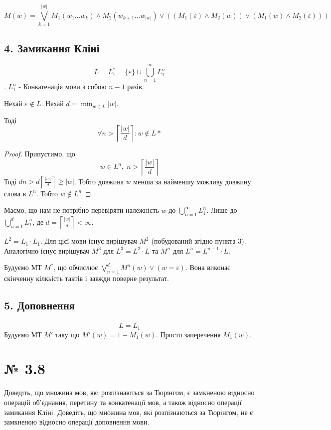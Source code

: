 \documentclass[11pt, a4paper]{article} %
\begin{document}
$$M(w) = \bigvee_{k=1}^{|w|} M_1(w_1 ... w_k) \wedge M_2(w_{k+1}...w_|w|) \vee \left(\left(M_1(\varepsilon) \wedge M_2(w)\right) \vee \left(M_1(w) \wedge M_2(\varepsilon)\right)\right)$$
\qedsymbol

\subsection*{4. Замикання Кліні}
$$L = L_1^* = \{\varepsilon\}\cup \bigcup_{n=1}^{\infty} L_1^n$$.
$L_1^n$ - Конкатенація мови з собою $n-1$ разів.

\begin{mdframed}[backgroundcolor=violet!10]
    Нехай $\varepsilon \notin L$. Нехай $d = \min_{w \in L} |w|$.
    
    Тоді $$\forall n > \left\lceil\frac{|w|}{d}\right\rceil: w \notin L*$$
    \begin{proof}
        Припустимо, що $$w \in L^n,\; n > \left\lceil\frac{|w|}{d}\right\rceil$$
        Тоді $dn > d\left\lceil\frac{|w|}{d}\right\rceil \ge |w|$.
        Тобто довжина $w$ менша за найменшу можливу довжину слова в $L^n$.
        Тобто $w \notin L^n$ 
    \end{proof}
\end{mdframed}
Маємо, що нам не потрібно перевіряти належність $w$ до $\bigcup_{n=1}^{\infty} L_1^n$. 
Лише до $\bigcup_{n=1}^{d} L_1^n$, де $d = \left\lceil\frac{|w|}{d}\right\rceil < \infty$.

$L^2 = L_1 \cdot L_1$. Для цієї мови існує вирішувач $M^2$ (побудований згідно пункта 3).
Аналогічно існує вирішувач $M^3$ для $L^3 = L^2 \cdot L$ та $M^n$ для $L^n = L^{n-1} \cdot L$.

Будуємо МТ $M^*$, що обчислює $\bigvee_{n=1}^{d} M^n(w) \vee (w=\varepsilon)$.
Вона виконає скінченну кілкьість тактів і завжди поверне результат.
\qedsymbol

\subsection*{5. Доповнення}
$$L = \overline{L_1}$$
Будуємо МТ $M'$ таку що $M'(w) = 1 - M_1(w)$. Просто заперечення $M_1(w)$. \qedsymbol

\section*{№ 3.8}
\begin{mdframed}
    Доведiть, що множина мов, якi розпiзнаються за Тюрiнгом, є замкненою
вiдносно операцiй об’єднання, перетину та конкатенацiї мов, а також вiдносно
операцiї замикання Клiнi. Доведiть, що множина мов, якi розпiзнаються за
Тюрiнгом, не є замкненою вiдносно операцiї доповнення мови.
\end{mdframed}
\end{document}
